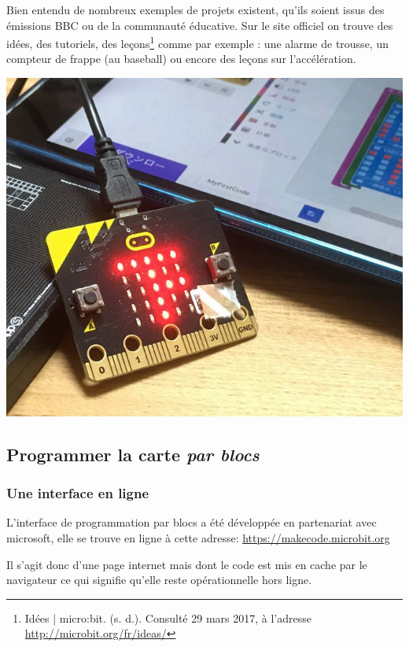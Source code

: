 \begin{minipage}[b]{0.45\linewidth}
    Bien entendu de nombreux exemples de projets existent, qu’ils soient issus des émissions BBC ou de la communauté éducative. Sur le site officiel on trouve des idées, des tutoriels, des leçons\footnote{Idées | micro:bit. (s. d.). Consulté 29 mars 2017, à l’adresse \url{http://microbit.org/fr/ideas/}} comme par exemple : une alarme de trousse, un compteur de frappe (au baseball) ou encore des leçons sur l’accélération.
    \vspace{1em}
    \begin{center}
        \includegraphics[width=\linewidth]{res/mb-ap-08}
    \end{center}
\end{minipage}


\subsection{Programmer la carte \mb \emph{par blocs}}

\subsubsection{Une interface en ligne}

L’interface de programmation par blocs a été développée en partenariat avec microsoft, elle se trouve en ligne à cette adresse: \url{https://makecode.microbit.org}

Il s’agit donc d’une page internet mais dont le code est mis en cache par le navigateur ce qui signifie qu’elle reste opérationnelle hors ligne.


